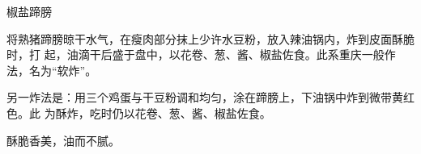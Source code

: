 \begin{recipe}{椒盐蹄膀}

\ingredients


\preparation

将熟猪蹄膀晾干水气，在瘦肉部分抹上少许水豆粉，放入辣油锅内，炸到皮面酥脆时，打
起，油滴干后盛于盘中，以花卷、葱、酱、椒盐佐食。此系重庆一般作法，名为“软炸”。

另一炸法是：用三个鸡蛋与干豆粉调和均匀，涂在蹄膀上，下油锅中炸到微带黄红色。此
为酥炸，吃时仍以花卷、葱、酱、椒盐佐食。

\features

酥脆香美，油而不腻。

\end{recipe}


